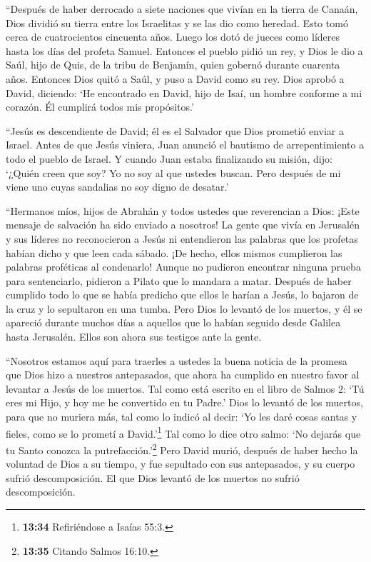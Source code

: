 ``Después de haber derrocado a siete naciones que vivían
en la tierra de Canaán, Dios dividió su tierra entre los Israelitas y se
las dio como heredad. Esto tomó cerca de cuatrocientos cincuenta años.
 Luego los dotó de jueces como líderes hasta los días del
profeta Samuel.  Entonces el pueblo pidió un rey, y Dios le
dio a Saúl, hijo de Quis, de la tribu de Benjamín, quien gobernó durante
cuarenta años.  Entonces Dios quitó a Saúl, y puso a David
como su rey. Dios aprobó a David, diciendo: `He encontrado en David,
hijo de Isaí, un hombre conforme a mi corazón. Él cumplirá todos mis
propósitos.'

 ``Jesús es descendiente de David; él es el Salvador que
Dios prometió enviar a Israel.  Antes de que Jesús viniera,
Juan anunció el bautismo de arrepentimiento a todo el pueblo de Israel.
 Y cuando Juan estaba finalizando su misión, dijo: `¿Quién
creen que soy? Yo no soy al que ustedes buscan. Pero después de mi viene
uno cuyas sandalias no soy digno de desatar.'

 ``Hermanos míos, hijos de Abrahán y todos ustedes que
reverencian a Dios: ¡Este mensaje de salvación ha sido enviado a
nosotros!  La gente que vivía en Jerusalén y sus líderes no
reconocieron a Jesús ni entendieron las palabras que los profetas habían
dicho y que leen cada sábado. ¡De hecho, ellos mismos cumplieron las
palabras proféticas al condenarlo!  Aunque no pudieron
encontrar ninguna prueba para sentenciarlo, pidieron a Pilato que lo
mandara a matar.  Después de haber cumplido todo lo que se
había predicho que ellos le harían a Jesús, lo bajaron de la cruz y lo
sepultaron en una tumba.  Pero Dios lo levantó de los
muertos,  y él se apareció durante muchos días a aquellos
que lo habían seguido desde Galilea hasta Jerusalén. Ellos son ahora sus
testigos ante la gente.

 ``Nosotros estamos aquí para traerles a ustedes la buena
noticia de la promesa que Dios hizo a nuestros antepasados,
 que ahora ha cumplido en nuestro favor al levantar a Jesús
de los muertos. Tal como está escrito en el libro de Salmos 2: `Tú eres
mi Hijo, y hoy me he convertido en tu Padre.'  Dios lo
levantó de los muertos, para que no muriera más, tal como lo indicó al
decir: `Yo les daré cosas santas y fieles, como se lo prometí a
David.'\footnote{\textbf{13:34} Refiriéndose a Isaías 55:3.}
 Tal como lo dice otro salmo: `No dejarás que tu Santo
conozca la putrefacción.'\footnote{\textbf{13:35} Citando Salmos 16:10.}
 Pero David murió, después de haber hecho la voluntad de
Dios a su tiempo, y fue sepultado con sus antepasados, y su cuerpo
sufrió descomposición.  El que Dios levantó de los muertos
no sufrió descomposición.

